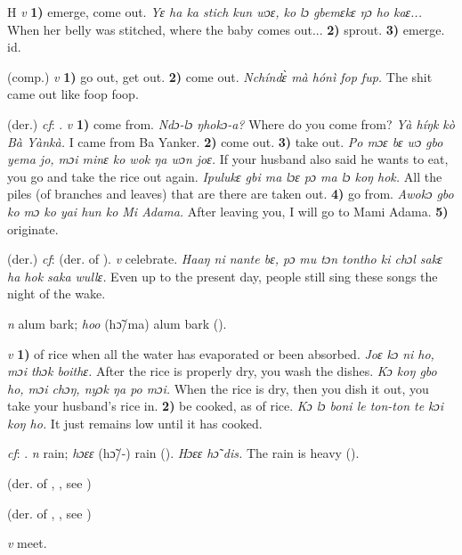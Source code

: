 \begin{letter}{H}
 \textit{v} \textbf{1)} emerge, come out. \textit{Yɛ ha ka stich kun wɔɛ, ko lɔ gbemɛkɛ ŋɔ ho kaɛ...} When her belly was stitched, where the baby comes out... \textbf{2)} sprout. \textbf{3)} emerge. id. 

 (comp.) \textit{v} \textbf{1)} go out, get out. \textbf{2)} come out. \textit{Nchíndɛ̀ mà hónì fop fup.} The shit came out like foop foop.

 (der.) \textit{cf}: . \textit{v} \textbf{1)} come from. \textit{Ndɔ-lɔ ŋhokɔ-a?} Where do you come from? \textit{Yà híŋk kò Bà Yànkà.} I came from Ba Yanker. \textbf{2)} come out. \textbf{3)} take out. \textit{Po mɔɛ bɛ wɔ gbo yema jo, mɔi minɛ ko wok ŋa wɔn joɛ.} If your husband also said he wants to eat, you go and take the rice out again. \textit{Ipulukɛ gbi ma lɔɛ pɔ ma lɔ koŋ hok.} All the piles (of branches and leaves) that are there are taken out. \textbf{4)} go from. \textit{Awokɔ gbo ko mɔ ko yai hun ko Mi Adama.} After leaving you, I will go to Mami Adama. \textbf{5)} originate.

 (der.) \textit{cf}:  (der. of ). \textit{v} celebrate. \textit{Haaŋ ni nante bɛ, pɔ mu tɔn tontho ki chɔl sakɛ ha hok saka wullɛ.} Even up to the present day, people still sing these songs the night of the wake.

 \textit{n} alum bark; \textit{hoo} (hɔ̃/ma) alum bark (\citealt{Pichl1967}). 

 \textit{v} \textbf{1)} of rice when all the water has evaporated or been absorbed. \textit{Joɛ kɔ ni ho, mɔi thɔk boithɛ.} After the rice is properly dry, you wash the dishes. \textit{Kɔ koŋ gbo ho, mɔi chɔŋ, nyɔk ŋa po mɔi.} When the rice is dry, then you dish it out, you take your husband's rice in. \textbf{2)} be cooked, as of rice. \textit{Kɔ lɔ boni le ton-ton te kɔi koŋ ho.} It just remains low until it has cooked.

 \textit{cf}: . \textit{n} rain; \textit{hɔɛɛ} (hɔ̃/-) rain (\citealt{Pichl1967}). \textit{Hɔɛɛ hɔ̃ dis.} The rain is heavy (\citealt{Pichl1967}). 

 (der. of , , see ) 

 (der. of , , see ) 

 \textit{v} meet.


\end{letter}
